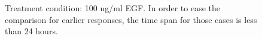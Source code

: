 \documentclass{bmcart}
\begin{document}
\begin{figure}[!tpb]
\begin{minipage}{\textwidth}
\begin{center}
\end{center}
\caption{ Treatment condition: 100 ng/ml EGF.
In order to ease the comparison for earlier responses, the time span for those cases is less than 24 hours.}\label{fig:differences2}
\end{minipage}
\end{figure}
\end{document}
